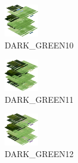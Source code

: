 \hspace{0.1cm}
\begin{minipage}[b]{0.15\linewidth}
\begin{figure}[H]                                                          
  \centering                                                             
  \begin{adjustbox}{width=1.5cm,center}                                   
  \includegraphics[width=1.5cm]{src/colorspace_colourflow/flows/colourflow_218-45.png}%
  \end{adjustbox}                                                        
\caption*{DARK\_GREEN10}                                           
\end{figure}                                                               
\end{minipage}
\hspace{0.1cm}
\begin{minipage}[b]{0.15\linewidth}
\begin{figure}[H]                                                          
  \centering                                                             
  \begin{adjustbox}{width=1.5cm,center}                                   
  \includegraphics[width=1.5cm]{src/colorspace_colourflow/flows/colourflow_219-45.png}%
  \end{adjustbox}                                                        
\caption*{DARK\_GREEN11}                                           
\end{figure}                                                               
\end{minipage}
\hspace{0.1cm}
\begin{minipage}[b]{0.15\linewidth}
\begin{figure}[H]                                                          
  \centering                                                             
  \begin{adjustbox}{width=1.5cm,center}                                   
  \includegraphics[width=1.5cm]{src/colorspace_colourflow/flows/colourflow_220-45.png}%
  \end{adjustbox}                                                        
\caption*{DARK\_GREEN12}                                           
\end{figure}                                                               
\end{minipage}
